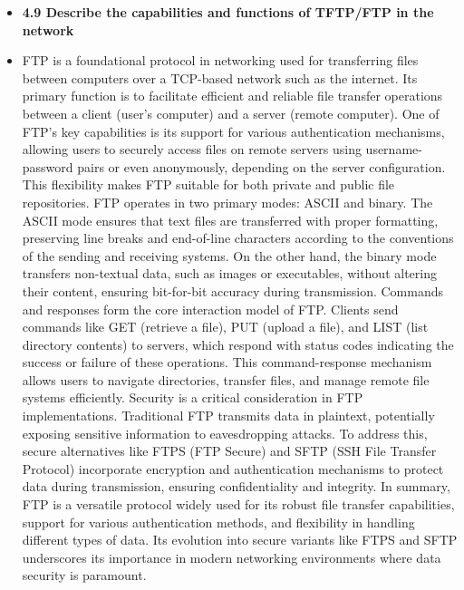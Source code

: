 \documentclass{article}
\begin{document}
\begin{itemize}
  \item \textbf{4.9 Describe the capabilities and functions of TFTP/FTP in the network}
  	\item[] FTP is a foundational protocol in networking used for transferring files between computers over a TCP-based network such as the internet. Its primary function is to facilitate efficient and reliable file transfer operations between a client (user's computer) and a server (remote computer). One of FTP's key capabilities is its support for various authentication mechanisms, allowing users to securely access files on remote servers using username-password pairs or even anonymously, depending on the server configuration. This flexibility makes FTP suitable for both private and public file repositories. FTP operates in two primary modes: ASCII and binary. The ASCII mode ensures that text files are transferred with proper formatting, preserving line breaks and end-of-line characters according to the conventions of the sending and receiving systems. On the other hand, the binary mode transfers non-textual data, such as images or executables, without altering their content, ensuring bit-for-bit accuracy during transmission. Commands and responses form the core interaction model of FTP. Clients send commands like GET (retrieve a file), PUT (upload a file), and LIST (list directory contents) to servers, which respond with status codes indicating the success or failure of these operations. This command-response mechanism allows users to navigate directories, transfer files, and manage remote file systems efficiently. Security is a critical consideration in FTP implementations. Traditional FTP transmits data in plaintext, potentially exposing sensitive information to eavesdropping attacks. To address this, secure alternatives like FTPS (FTP Secure) and SFTP (SSH File Transfer Protocol) incorporate encryption and authentication mechanisms to protect data during transmission, ensuring confidentiality and integrity. In summary, FTP is a versatile protocol widely used for its robust file transfer capabilities, support for various authentication methods, and flexibility in handling different types of data. Its evolution into secure variants like FTPS and SFTP underscores its importance in modern networking environments where data security is paramount.

\end{itemize}
\end{document}
